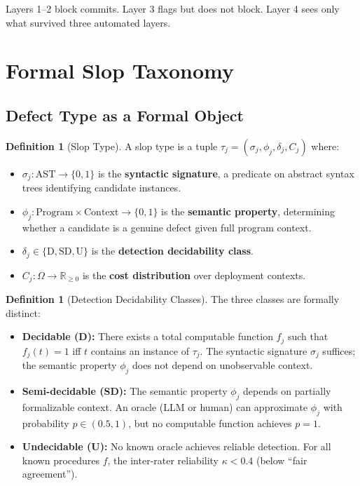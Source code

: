 \documentclass[11pt, a4paper]{article}
\theoremstyle{definition}
\newtheorem{definition}[theorem]{Definition}
\theoremstyle{remark}
\begin{document}
Layers 1--2 block commits. Layer 3 flags but does not block. Layer 4 sees only what survived three automated layers.


\section{Formal Slop Taxonomy}
\label{sec:taxonomy}

\subsection{Defect Type as a Formal Object}

\begin{definition}[Slop Type]
\label{def:sloptype}
A slop type is a tuple $\tau_j = (\sigma_j, \phi_j, \delta_j, C_j)$ where:
\begin{itemize}[leftmargin=2em]
\item $\sigma_j : \mathrm{AST} \to \{0, 1\}$ is the \textbf{syntactic signature}, a predicate on abstract syntax trees identifying candidate instances.
\item $\phi_j : \mathrm{Program} \times \mathrm{Context} \to \{0, 1\}$ is the \textbf{semantic property}, determining whether a candidate is a genuine defect given full program context.
\item $\delta_j \in \{\mathrm{D}, \mathrm{SD}, \mathrm{U}\}$ is the \textbf{detection decidability class}.
\item $C_j : \Omega \to \mathbb{R}_{\geq 0}$ is the \textbf{cost distribution} over deployment contexts.
\end{itemize}
\end{definition}

\begin{definition}[Detection Decidability Classes]
\label{def:decidability}
The three classes are formally distinct:
\begin{itemize}[leftmargin=2em]
\item \textbf{Decidable (D):} There exists a total computable function $f_j$ such that $f_j(t) = 1$ iff $t$ contains an instance of $\tau_j$. The syntactic signature $\sigma_j$ suffices; the semantic property $\phi_j$ does not depend on unobservable context.

\item \textbf{Semi-decidable (SD):} The semantic property $\phi_j$ depends on partially formalizable context. An oracle (LLM or human) can approximate $\phi_j$ with probability $p \in (0.5, 1)$, but no computable function achieves $p = 1$.

\item \textbf{Undecidable (U):} No known oracle achieves reliable detection. For all known procedures $f$, the inter-rater reliability $\kappa < 0.4$ (below ``fair agreement'').
\end{itemize}
\end{definition}
\end{document}

